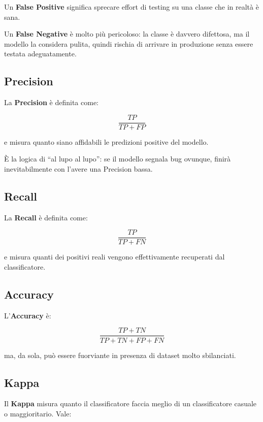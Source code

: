 \begin{notaprof}
Un \textbf{False Positive} significa sprecare effort di testing su una classe che in realtà è sana.
\end{notaprof}

\begin{notaprof}
Un \textbf{False Negative} è molto più pericoloso: la classe è davvero difettosa, ma il modello la considera pulita, quindi rischia di arrivare in produzione senza essere testata adeguatamente.
\end{notaprof}

\subsection{Precision}

La \textbf{Precision} è definita come:

\[
\frac{TP}{TP+FP}
\]

e misura quanto siano affidabili le predizioni positive del modello.

\begin{notaprof}
È la logica di ``al lupo al lupo'': se il modello segnala bug ovunque, finirà inevitabilmente con l'avere una Precision bassa.
\end{notaprof}

\subsection{Recall}

La \textbf{Recall} è definita come:

\[
\frac{TP}{TP+FN}
\]

e misura quanti dei positivi reali vengono effettivamente recuperati dal classificatore.

\subsection{Accuracy}

L'\textbf{Accuracy} è:

\[
\frac{TP+TN}{TP+TN+FP+FN}
\]

ma, da sola, può essere fuorviante in presenza di dataset molto sbilanciati.

\subsection{Kappa}

Il \textbf{Kappa} misura quanto il classificatore faccia meglio di un classificatore casuale o maggioritario. Vale:

